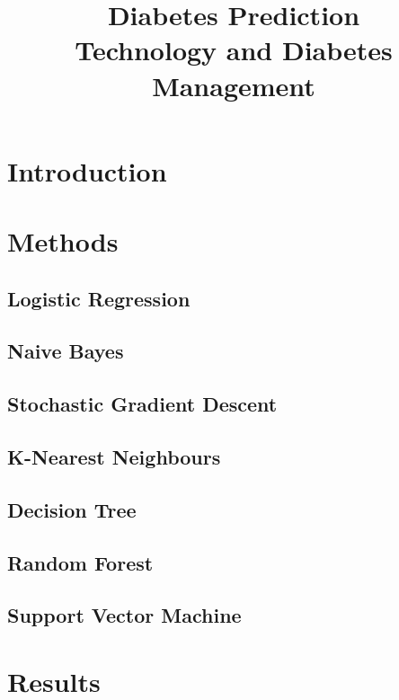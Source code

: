 \documentclass[conference]{IEEEtran}
\begin{document}
\title{Diabetes Prediction\\
{\footnotesize Technology and Diabetes Management}}

\author{
	\and
	\and
}
\maketitle

\section{Introduction}

\section{Methods}

\subsection{Logistic Regression}
\subsection{Naive Bayes}
\subsection{Stochastic Gradient Descent}
\subsection{K-Nearest Neighbours}
\subsection{Decision Tree}
\subsection{Random Forest}
\subsection{Support Vector Machine}

\section{Results}
\end{document}
